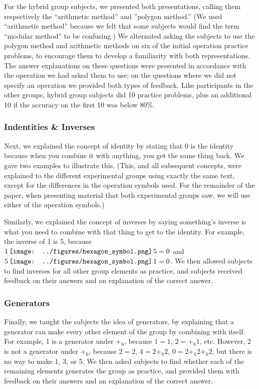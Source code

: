 \documentclass[man,10pt]{apa6}
\newcommand{\hex}{\,\vcenter{\hbox{\texttt{[image: ../figures/hexagon\_symbol.png]}}}\,}
\begin{document}
For the hybrid group subjects, we presented both presentations, calling them respectively the ``arithmetic method'' and ''polygon method.'' (We used ``arithmetic method'' because we felt that some subjects would find the term ``modular method'' to be confusing.) We alternated asking the subjects to use the polygon method and arithmetic methods on six of the initial operation practice problems, to encourage them to develop a familiarity with both representations. The answer explanations on these questions were presented in accordance with the operation we had asked them to use; on the questions where we did not specify an operation we provided both types of feedback. Like participants in the other groups, hybrid group subjects did 10 practice problems, plus an additional 10 if the accuracy on the first 10 was below 80\%. 
\subsubsection{Indentities \& Inverses}
Next, we explained the concept of identity by stating that 0 is the identity because when you combine it with anything, you get the same thing back. We gave two examples to illustrate this. (This, and all subsequent concepts, were explained to the different experimental groups using exactly the same text, except for the differences in the operation symbols used. For the remainder of the paper, when presenting material that both experimental groups saw, we will use either of the operation symbols.)\par
Similarly, we explained the concept of inverses by saying something's inverse is what you need to combine with that thing to get to the identity. For example, the inverse of 1 is 5, because $1 \hex 5 = 0$ and $5 \hex 1 = 0$. We then allowed subjects to find inverses for all other group elements as practice, and subjects received feedback on their answers and an explanation of the correct answer.
\subsubsection{Generators}
Finally, we taught the subjects the idea of generators, by explaining that a generator can make every other element of the group by combining with itself. For example, 1 is a generator under $+_6$, because $1 = 1$, $2 = +_6 1$, etc. However, 2 is not a generator under $+_6$, because $2 = 2$, $4 = 2 +_6 2$, $0 = 2 +_6 2 +_6 2$, but there is no way to make 1, 3, or 5. We then asked subjects to find whether each of the remaining elements generates the group as practice, and provided them with feedback on their answers and an explanation of the correct answer.
\end{document}
